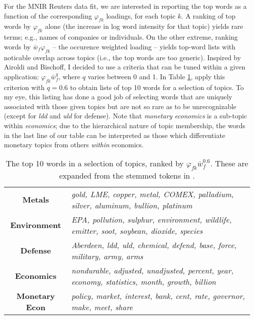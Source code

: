 \documentclass[12pt]{article}
\begin{document}
For the MNIR Reuters data fit, we are interested in reporting the top words as a function of the corresponding $\varphi_{fk}$ loadings, for each topic $k$.  A ranking of top words by $\varphi_{fk}$ alone (the increase in log word intensity for that topic) yields rare terms; e.g., names of companies or individuals.  On the other extreme, ranking words by ${\bar w}_f\varphi_{fk}$ -- the occurence weighted loading -- yields top-word lists with noticable overlap across topics (i.e., the top words are too generic).  Inspired by Airoldi and Bischoff, I decided to use a criteria that can be tuned within a given application: $\varphi_{fk}{\bar w}_f^q$, where $q$ varies between 0 and 1.  In Table \ref{wordtab}, apply this criterion with $q=0.6$ to obtain lists of top 10 words for a selection of topics. To my eye, this listing has done a good job of selecting words that are uniquely associated with those given topics but are not so rare as to be unrecognizable (except for {\it ldd} and {\it uld} for defense).  Note that {\it monetary economics} is a sub-topic within {\it economics}; due to the hierarchical nature of topic membership, the words in the last line of our table can be interpreted as those which differentiate monetary topics from others {\it within} economics.

\begin{table}[h]\footnotesize
  \begin{tabular}{c|l}
  \bf  Metals & \it gold, LME, copper, metal, COMEX, palladium, silver, aluminum, bullion, platinum \\
 \bf  Environment & \it EPA, pollution, sulphur, environment, wildlife, emitter, soot, soybean, dioxide, species \\
 \bf  Defense & \it Aberdeen, ldd, uld, chemical, defend, base, force, military, army, arms \\
 \bf  Economics & \it nondurable, adjusted, unadjusted, percent, year, economy, statistics, month, growth, billion \\
 \bf  Monetary Econ & \it policy, market, interest, bank, cent, rate, governor, make, meet, share 
 \end{tabular}
 \caption{\label{wordtab} The top 10 words in a selection of topics, ranked by $\varphi_{fk} {\bar w}_f^{0.6}$. These are expanded from the stemmed tokens in \cite{lewis2004rcv1}.  }
\end{table}  
\end{document}
